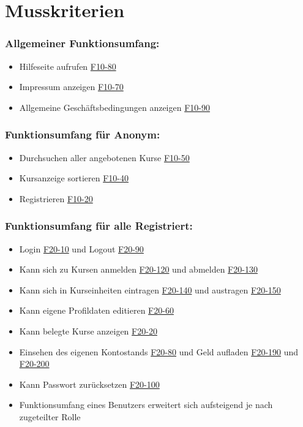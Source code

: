 \documentclass[a4paper]{scrreprt}
\begin{document}
    \section{Musskriterien}      
    	\subsubsection{Allgemeiner Funktionsumfang:}
      		\begin{itemize}
	      		\item Hilfeseite aufrufen \hyperlink{hilfeSeite}{F10-80}
	      		\item Impressum anzeigen \hyperlink{impressum}{F10-70}
	      		\item Allgemeine Geschäftsbedingungen anzeigen \hyperlink{agb}{F10-90}
      		\end{itemize}
     	\subsubsection{Funktionsumfang für \gls{Anonym}:}
       		\begin{itemize}
	      		\item Durchsuchen aller angebotenen Kurse \hyperlink{kursSuche}{F10-50}
	      		\item Kursanzeige sortieren \hyperlink{kursAnzSort}{F10-40}
	       		\item Registrieren \hyperlink{Registrieren}{F10-20}
       		\end{itemize}
     	\subsubsection{Funktionsumfang für alle \gls{Registriert}:}
			\begin{itemize}
				\item Login \hyperlink{login}{F20-10} und Logout \hyperlink{logout}{F20-90}
				\item Kann sich zu Kursen anmelden \hyperlink{kursAnmelden}{F20-120} und abmelden \hyperlink{kursAbmelden}{F20-130}
				\item Kann sich in Kurseinheiten eintragen \hyperlink{kurseinheitAnmelden}{F20-140} und austragen \hyperlink{kurseinheitAbmelden}{F20-150}
				\item Kann eigene Profildaten editieren \hyperlink{profilEdit}{F20-60}
				\item Kann belegte Kurse anzeigen \hyperlink{kurseAnzeigen}{F20-20}
				\item Einsehen des eigenen Kontostands \hyperlink{kontoAnzeigen}{F20-80} und Geld aufladen \hyperlink{kontoAufladenOn}{F20-190} und \hyperlink{kontoAufladenOff}{F20-200}
				\item Kann Passwort zurücksetzen \hyperlink{passwort}{F20-100}
				\item Funktionsumfang eines Benutzers erweitert sich aufsteigend je nach zugeteilter Rolle
			\end{itemize}
\end{document}
